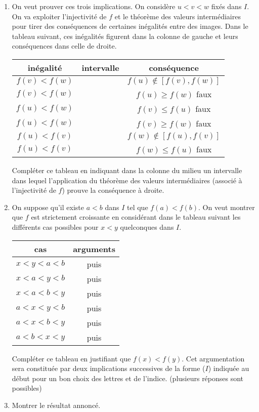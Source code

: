 \begin{enumerate}
 \item On veut prouver ces trois implications.\newline
On considère $u<v<w$ fixés dans $I$. On va exploiter l'injectivité de $f$ et le théorème des valeurs intermédiaires pour tirer des conséquences de certaines inégalités entre des images.\newline
Dans le tableau suivant, ces inégalités figurent dans la colonne de gauche et leurs conséquences dans celle de droite.
\begin{center}
\renewcommand{\arraystretch}{1.3}
\begin{tabular}{c|c|c}
 inégalité & intervalle & conséquence\\ \hline
 $f(v)<f(w)$ &  & $f(u)\not\in [f(v),f(w)]$\\ \hline
 $f(v)<f(w)$ &  & $f(u)\geq f(w)$ faux\\ \hline
 $f(u)<f(w)$ &  & $f(v)\leq f(u)$ faux\\ \hline
 $f(u)<f(w)$ &  & $f(v)\geq f(w)$ faux\\ \hline
 $f(u)<f(v)$ &  & $f(w)\not\in[f(u),f(v)]$\\ \hline
 $f(u)<f(v)$ &  & $f(w)\leq f(u)$ faux
\end{tabular}
\end{center}
Compléter ce tableau en indiquant dans la colonne du milieu un intervalle dans lequel l'application du théorème des valeurs intermédiaires (associé à l'injectivité de $f$) prouve la conséquence à droite. 
\item On suppose qu'il existe $a<b$ dans $I$ tel que $f(a)<f(b)$.\newline
On veut montrer que $f$ est strictement croissante en considérant dans le tableau suivant les différents cas possibles pour $x<y$ quelconques dans $I$. 
\begin{center}
\renewcommand{\arraystretch}{1.2}
\begin{tabular}{c|c}
cas & arguments\\ \hline
$x<y<a<b$ & \phantom{$I_1(a,b,c)$} puis \phantom{$I_1(a,b,c)$}\\ \hline
$x<a<y<b$ & \phantom{$I_1(a,b,c)$} puis \phantom{$I_1(a,b,c)$}\\ \hline
$x<a<b<y$ & \phantom{$I_1(a,b,c)$} puis \phantom{$I_1(a,b,c)$}\\ \hline
$a<x<y<b$ & \phantom{$I_1(a,b,c)$} puis \phantom{$I_1(a,b,c)$}\\ \hline
$a<x<b<y$ & \phantom{$I_1(a,b,c)$} puis \phantom{$I_1(a,b,c)$}\\ \hline
$a<b<x<y$ & \phantom{$I_1(a,b,c)$} puis \phantom{$I_1(a,b,c)$}
\end{tabular}
\end{center}
Compléter ce tableau en justifiant que $f(x)<f(y)$. Cet argumentation sera constituée par deux implications successives de la forme  ($I$) indiquée au début pour un bon choix des lettres et de l'indice. (plusieurs réponses sont possibles)
\item Montrer le résultat annoncé.
\end{enumerate}
